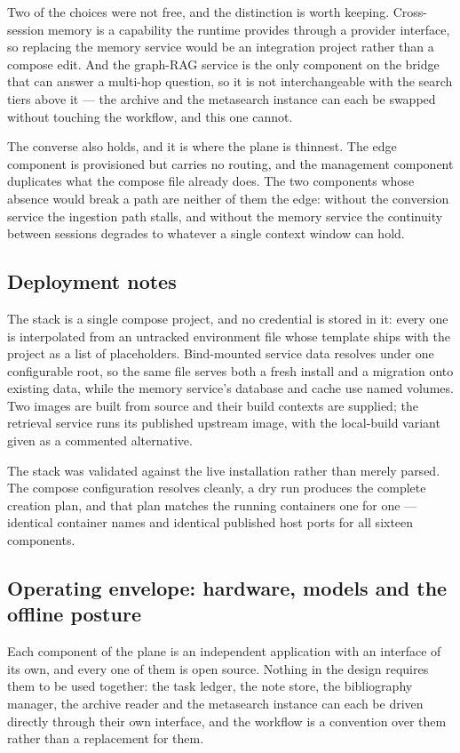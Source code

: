 \documentclass[10pt]{article}
\begin{document}
Two of the choices were not free, and the distinction is worth keeping. Cross-session memory is a
capability the runtime provides through a provider interface, so replacing the memory service would be
an integration project rather than a compose edit. And the graph-RAG service is the only component on
the bridge that can answer a multi-hop question, so it is not interchangeable with the search tiers
above it --- the archive and the metasearch instance can each be swapped without touching the
workflow, and this one cannot.

The converse also holds, and it is where the plane is thinnest. The edge component is provisioned but
carries no routing, and the management component duplicates what the compose file already does. The
two components whose absence would break a path are neither of them the edge: without the conversion
service the ingestion path stalls, and without the memory service the continuity between sessions
degrades to whatever a single context window can hold.

\subsection{Deployment notes}

The stack is a single compose project, and no credential is stored in it: every one is interpolated
from an untracked environment file whose template ships with the project as a list of placeholders.
Bind-mounted service data resolves under one configurable root, so the same file serves both a fresh
install and a migration onto existing data, while the memory service's database and cache use named
volumes. Two images are built from source and their build contexts are supplied; the retrieval
service runs its published upstream image, with the local-build variant given as a commented
alternative.

The stack was validated against the live installation rather than merely parsed. The compose
configuration resolves cleanly, a dry run produces the complete creation plan, and that plan matches
the running containers one for one --- identical container names and identical published host ports
for all sixteen components.

\subsection{Operating envelope: hardware, models and the offline posture}

Each component of the plane is an independent application with an interface of its own, and every one
of them is open source. Nothing in the design requires them to be used together: the task ledger, the
note store, the bibliography manager, the archive reader and the metasearch instance can each be
driven directly through their own interface, and the workflow is a convention over them rather than a
replacement for them.
\end{document}

